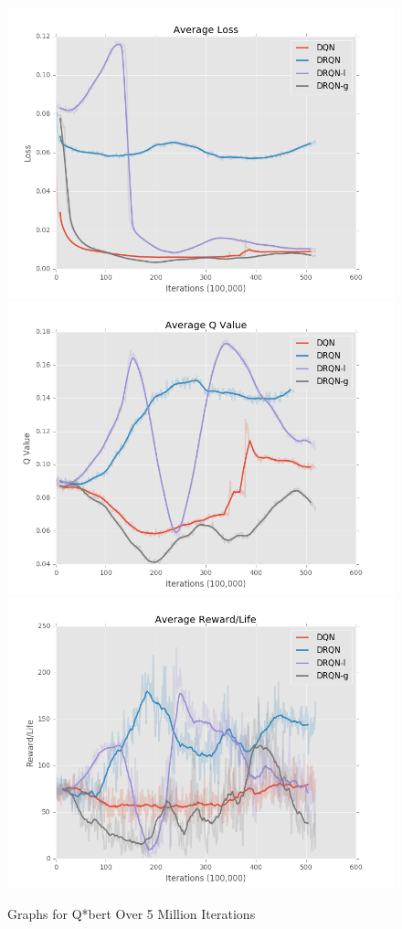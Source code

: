 \documentclass{article}
\begin{document}
\begin{figure}[h]
    \centering
    \begin{minipage}{1.0\textwidth}
        \centering
        \includegraphics[scale=0.2]{avg_loss}
        \centering
        \includegraphics[scale=0.2]{avg_q}
        \centering
        \includegraphics[scale=0.2]{avg_reward}
    \end{minipage}
    \caption{Graphs for Q*bert Over 5 Million Iterations}
\end{figure}
\end{document}
